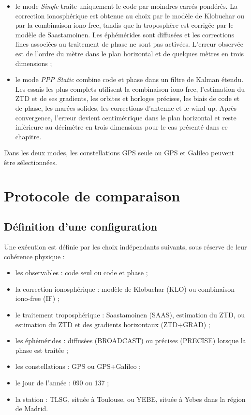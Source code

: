 \begin{itemize}
    \item le mode \emph{Single} traite uniquement le code par moindres carrés
    pondérés. La correction ionosphérique est obtenue au choix par le modèle de
    Klobuchar ou par la combinaison iono-free, tandis que la troposphère
    est corrigée par le modèle de Saastamoinen. Les éphémérides sont diffusées
    et les corrections fines associées au traitement de phase ne sont pas
    activées. L'erreur observée est de l'ordre du mètre dans le plan horizontal
    et de quelques mètres en trois dimensions ;

    \item le mode \emph{PPP Static} combine code et phase dans un filtre de
    Kalman étendu. Les essais les plus complets utilisent la combinaison
    iono-free, l'estimation du ZTD et de ses gradients, les orbites et
    horloges précises, les biais de code et de phase, les marées solides, les
    corrections d'antenne et le wind-up. Après convergence, l'erreur devient
    centimétrique dans le plan horizontal et reste inférieure au décimètre en
    trois dimensions pour le cas présenté dans ce chapitre.
\end{itemize}

Dans les deux modes, les constellations GPS seule ou GPS et Galileo peuvent
être sélectionnées.


\section{Protocole de comparaison}
\label{sec:validation_protocol}

\subsection{Définition d'une configuration}

Une exécution est définie par les choix indépendants suivants, sous réserve de
leur cohérence physique :

\begin{itemize}
    \item les observables : code seul ou code et phase ;
    \item la correction ionosphérique : modèle de Klobuchar (KLO) ou
    combinaison iono-free (IF) ;
    \item le traitement troposphérique : Saastamoinen (SAAS), estimation du
    ZTD, ou estimation du ZTD et des gradients horizontaux (ZTD+GRAD) ;
    \item les éphémérides : diffusées (BROADCAST) ou précises (PRECISE) lorsque
    la phase est traitée ;
    \item les constellations : GPS ou GPS+Galileo ;
    \item le jour de l'année : 090 ou 137 ;
    \item la station : TLSG, située à Toulouse, ou YEBE, située à Yebes dans la
    région de Madrid.
\end{itemize}

